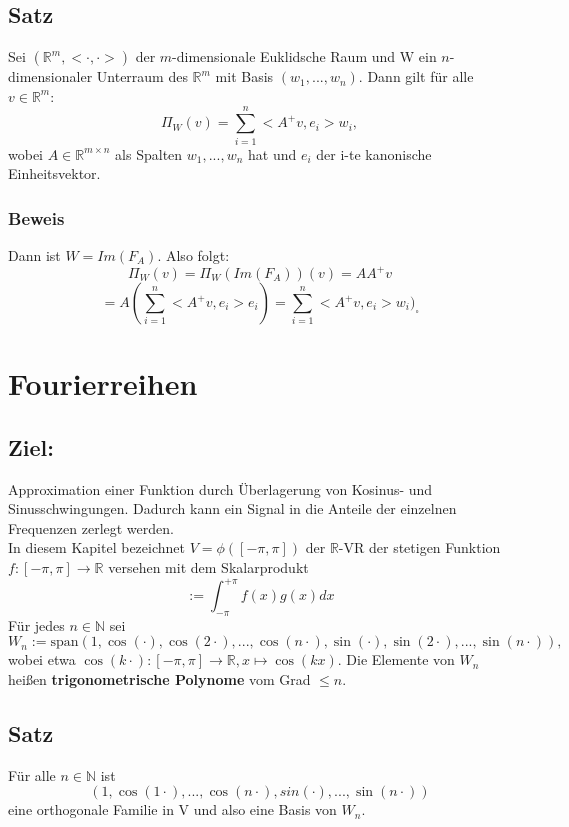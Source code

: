 \documentclass{scrbook}
\begin{document}
\section{Satz}
Sei $(\mathbb{R}^m,<\cdot,\cdot>)$ der $m$-dimensionale Euklidsche Raum und W ein $n$-dimensionaler Unterraum des $\mathbb{R}^m$ mit Basis $(w_1,...,w_n)$. Dann gilt für alle $v \in \mathbb{R}^m$:
\[
\Pi_W(v) = \sum^n_{i=1}<A^+v,e_i>w_i,
\]
wobei $A \in \mathbb{R}^{m \times n}$ als Spalten $w_1,...,w_n$ hat und $e_i$ der i-te kanonische Einheitsvektor.
\subsection*{Beweis}
Dann ist $W = Im(F_A)$. Also folgt:
\[
\Pi_W(v) = \Pi_W(Im(F_A))(v) = A A^+ v
\]
\[
=A(\sum^n_{i=1}<A^+v,e_i>e_i) = \sum^n_{i=1}<A^+v,e_i>w_i) _\square
\]
\chapter{Fourierreihen}
\section*{Ziel:}
Approximation einer Funktion durch Überlagerung von Kosinus- und Sinusschwingungen. Dadurch kann ein Signal in die Anteile der einzelnen Frequenzen zerlegt werden.\\
In diesem Kapitel bezeichnet $V = \phi([-\pi , \pi])$ der $\mathbb{R}$-VR der stetigen Funktion $f:[-\pi,\pi] \to \mathbb{R}$ versehen mit dem Skalarprodukt
\[<f,g> := \int^{+\pi}_{-\pi} f(x)g(x) dx\]
Für jedes $n\in \mathbb{N}$ sei
\[W_n := \text{span}(1,\cos(\cdot),\cos(2\cdot) , ..., \cos(n\cdot), \sin (\cdot) , \sin(2\cdot),...,\sin(n \cdot)),\]
wobei etwa $\cos(k\cdot) : [-\pi,\pi] \to \mathbb{R}, x \mapsto \cos(kx)$. Die Elemente von $W_n$ heißen \textbf{trigonometrische Polynome} vom Grad $\leq n$.
\section{Satz}
Für alle $n \in \mathbb{N}$ ist 
\[(1,\cos(1\cdot),...,\cos(n\cdot),sin(\cdot),...,\sin(n\cdot))\]
eine orthogonale Familie in V und also eine Basis von $W_n$.
\end{document}
